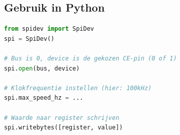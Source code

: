 \documentclass{article}
\begin{document}
\subsection{Gebruik in Python}

\begin{lstlisting}[language=Python]
from spidev import SpiDev
spi = SpiDev()

# Bus is 0, device is de gekozen CE-pin (0 of 1)
spi.open(bus, device)                

# Klokfrequentie instellen (hier: 100kHz)
spi.max_speed_hz = ...                  

# Waarde naar register schrijven
spi.writebytes([register, value])       
\end{lstlisting}
\end{document}
